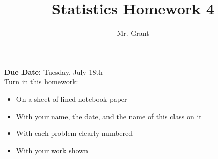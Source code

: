 \documentclass[12pt]{article}
\begin{document}
\title{Statistics Homework 4}
\author{Mr. Grant}
\maketitle

\textbf{Due Date:} Tuesday, July 18th \\

Turn in this homework:
\begin{itemize}
	\item On a sheet of lined notebook paper
	\item With your name, the date, and the name of this class on it
	\item With each problem clearly numbered
	\item With your work shown
\end{itemize}
\end{document}
